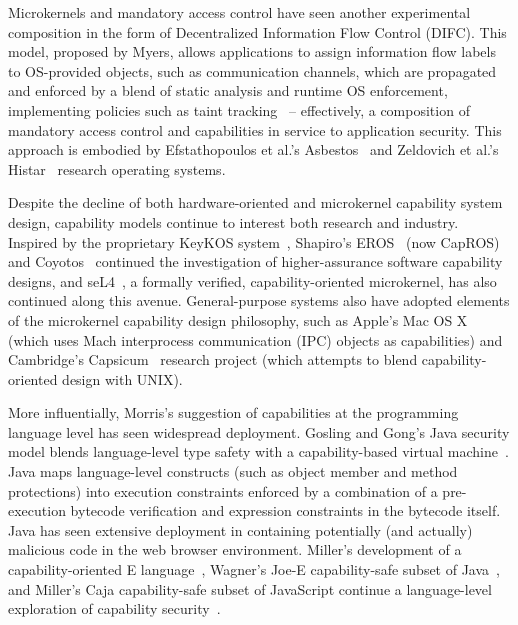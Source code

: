 Microkernels and mandatory access control have seen another experimental
composition in the form of Decentralized Information Flow Control (DIFC).
This model, proposed by Myers, allows applications to assign information flow labels
to OS-provided objects, such as communication channels, which are propagated and
enforced by a blend of static analysis and runtime OS enforcement, implementing
policies such as taint tracking~\cite{myers:difc} -- effectively, a composition of mandatory
access control and capabilities in service to application security.
This approach is embodied by Efstathopoulos et al.'s Asbestos~\cite{efstathopoulos:asbestos}
and Zeldovich et al.'s Histar~\cite{zeldovich:histar} research operating systems.

Despite the decline of both hardware-oriented and microkernel
capability system design, capability models continue to interest both
research and industry.  Inspired by the proprietary KeyKOS
system~\cite{hardy:keykos}, Shapiro's EROS~\cite{shapiro:eros} (now
CapROS) and Coyotos~\cite{shapiro:2004} continued the investigation of higher-assurance software
capability designs, and
seL4~\cite{klein:sel4}, a formally verified, capability-oriented
microkernel, has also continued along this avenue.
General-purpose systems also have adopted elements of the microkernel capability design
philosophy, such as Apple's Mac OS X~\cite{apple:macosx}
(which uses Mach interprocess communication (IPC)
objects as capabilities) and
Cambridge's Capsicum~\cite{Watson10} research project
(which attempts to blend capability-oriented design with UNIX).

More influentially, Morris's suggestion of capabilities at the programming language
level has seen widespread deployment.
Gosling and Gong's Java security model blends language-level type safety with a capability-based
virtual machine~\cite{gosling:javalanguage,Gong+97}.
Java maps language-level constructs (such as object member and method protections) into
execution constraints enforced by a combination of a pre-execution bytecode verification
and expression constraints in the bytecode itself.
Java has seen extensive deployment in containing potentially (and actually) malicious
code in the web browser environment.
Miller's development of a capability-oriented E language~\cite{miller:robustcomposition},
Wagner's Joe-E capability-safe
subset of Java~\cite{mettler:joee}, and Miller's Caja capability-safe subset of JavaScript continue a
language-level exploration of capability security~\cite{miller:caja}.

